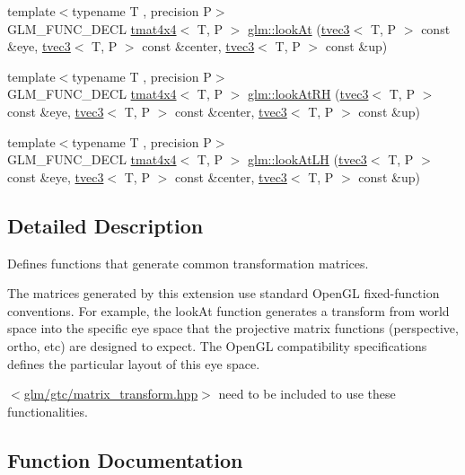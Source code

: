 \begin{DoxyCompactItemize}
\item 
{\footnotesize template$<$typename T , precision P$>$ }\\G\+L\+M\+\_\+\+F\+U\+N\+C\+\_\+\+D\+E\+CL \hyperlink{structglm_1_1tmat4x4}{tmat4x4}$<$ T, P $>$ \hyperlink{group__gtc__matrix__transform_gaf8eef81da1ad09f6a8920101c01eaae4}{glm\+::look\+At} (\hyperlink{structglm_1_1tvec3}{tvec3}$<$ T, P $>$ const \&eye, \hyperlink{structglm_1_1tvec3}{tvec3}$<$ T, P $>$ const \&center, \hyperlink{structglm_1_1tvec3}{tvec3}$<$ T, P $>$ const \&up)
\item 
{\footnotesize template$<$typename T , precision P$>$ }\\G\+L\+M\+\_\+\+F\+U\+N\+C\+\_\+\+D\+E\+CL \hyperlink{structglm_1_1tmat4x4}{tmat4x4}$<$ T, P $>$ \hyperlink{group__gtc__matrix__transform_ga2876d9313334980b94292d2ec169088e}{glm\+::look\+At\+RH} (\hyperlink{structglm_1_1tvec3}{tvec3}$<$ T, P $>$ const \&eye, \hyperlink{structglm_1_1tvec3}{tvec3}$<$ T, P $>$ const \&center, \hyperlink{structglm_1_1tvec3}{tvec3}$<$ T, P $>$ const \&up)
\item 
{\footnotesize template$<$typename T , precision P$>$ }\\G\+L\+M\+\_\+\+F\+U\+N\+C\+\_\+\+D\+E\+CL \hyperlink{structglm_1_1tmat4x4}{tmat4x4}$<$ T, P $>$ \hyperlink{group__gtc__matrix__transform_gacd0c077ec7b58a575855e29cb5fb586d}{glm\+::look\+At\+LH} (\hyperlink{structglm_1_1tvec3}{tvec3}$<$ T, P $>$ const \&eye, \hyperlink{structglm_1_1tvec3}{tvec3}$<$ T, P $>$ const \&center, \hyperlink{structglm_1_1tvec3}{tvec3}$<$ T, P $>$ const \&up)
\end{DoxyCompactItemize}


\subsection{Detailed Description}
Defines functions that generate common transformation matrices. 

The matrices generated by this extension use standard Open\+GL fixed-\/function conventions. For example, the look\+At function generates a transform from world space into the specific eye space that the projective matrix functions (perspective, ortho, etc) are designed to expect. The Open\+GL compatibility specifications defines the particular layout of this eye space.

$<$\hyperlink{matrix__transform_8hpp}{glm/gtc/matrix\+\_\+transform.\+hpp}$>$ need to be included to use these functionalities. 

\subsection{Function Documentation}
\mbox{\label{group__gtc__matrix__transform_gada6deb989d4b553fe0f7e3279f3afae1}} 
